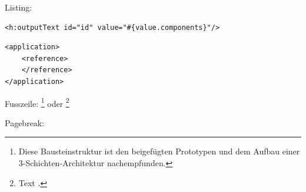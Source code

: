 Listing:
\begin{lstlisting}[caption={Listingunterschrift, angelehnt an {\cite[vgl. Seite 45]{busch2009rich}}}, label=lst:listingExample]
<h:outputText id="id" value="#{value.components}"/>
\end{lstlisting}

\begin{lstlisting}[caption={Listingunterschrift, Quelle: {\cite{personalization03}}}, label=lst:listingExample2]
<application>
	<reference>
	</reference>
</application>
\end{lstlisting}


Fusszeile:
\footnote{Diese Bausteinstruktur ist den beigefügten Prototypen und dem Aufbau einer 3-Schichten-Architektur nachempfunden.}
oder
\footnote{Text \cite[vgl. Seite 501]{musciano2002html}.}

Pagebreak:		\pagebreak

